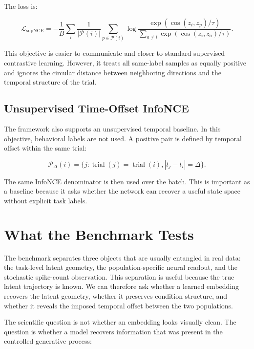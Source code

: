 \documentclass[11pt]{article}
\begin{document}
The loss is:

\begin{equation}
\mathcal{L}_{\text{supNCE}} =
- \frac{1}{B}\sum_i
\frac{1}{|\mathcal{P}(i)|}
\sum_{p \in \mathcal{P}(i)}
\log
\frac{\exp(\operatorname{cos}(z_i,z_p)/\tau)}
{\sum_{a \ne i}\exp(\operatorname{cos}(z_i,z_a)/\tau)}.
\end{equation}

This objective is easier to communicate and closer to standard supervised
contrastive learning. However, it treats all same-label samples as equally
positive and ignores the circular distance between neighboring directions and
the temporal structure of the trial.

\subsection{Unsupervised Time-Offset InfoNCE}

The framework also supports an unsupervised temporal baseline. In this
objective, behavioral labels are not used. A positive pair is defined by
temporal offset within the same trial:

\begin{equation}
\mathcal{P}_{\Delta}(i) =
\{j : \operatorname{trial}(j)=\operatorname{trial}(i),
|t_j-t_i|=\Delta\}.
\end{equation}

The same InfoNCE denominator is then used over the batch. This is important as
a baseline because it asks whether the network can recover a useful state
space without explicit task labels.

\section{What the Benchmark Tests}

The benchmark separates three objects that are usually entangled in real data:
the task-level latent geometry, the population-specific neural readout, and the
stochastic spike-count observation. This separation is useful because the true
latent trajectory is known. We can therefore ask whether a learned embedding
recovers the latent geometry, whether it preserves condition structure, and
whether it reveals the imposed temporal offset between the two populations.

The scientific question is not whether an embedding looks visually clean. The
question is whether a model recovers information that was present in the
controlled generative process:
\end{document}
